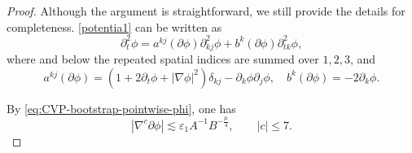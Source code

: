\documentclass[11pt,twoside]{article}
\def\f{\frac}
\def\p{\partial}
\def\ve{\varepsilon}
\def\ls{\lesssim}
\theoremstyle{plain}
\theoremstyle{definition}
\theoremstyle{assumption}
\numberwithin{equation}{section}
\begin{document}
	\begin{proof}
    Although the argument is straightforward, we still provide the details for completeness.
		\eqref{potentia1} can be written as
		\begin{equation}
			\label{eq:CVP-ttphi-coefficient-form}
			\p_t^2\phi
			=
			a^{kj}(\p\phi)\p_{kj}^2\phi
			+
			b^k(\p\phi)\p_{tk}^2\phi,
		\end{equation}
		where and below the repeated spatial indices are summed over $1,2,3$, and
		\begin{equation}
			\label{eq:CVP-coefficient-a}
			a^{kj}(\p\phi)
			=
			\left(
			1+2\p_t\phi+|\nabla\phi|^2
			\right)\delta_{kj}
			-\p_k\phi\p_j\phi,\quad
			b^k(\p\phi)
			=-2\p_k\phi.
		\end{equation}
		
		By \eqref{eq:CVP-bootstrap-pointwise-phi}, one has
		\begin{equation}
			\label{eq:CVP-basic-pointwise-from-bootstrap}
			|\nabla^c\p\phi|
			\ls
			\ve_1A^{-1}B^{-{\f\mu4}},
			\qquad
			|c|\le 7.
		\end{equation}
	

\end{proof}
\end{document}

